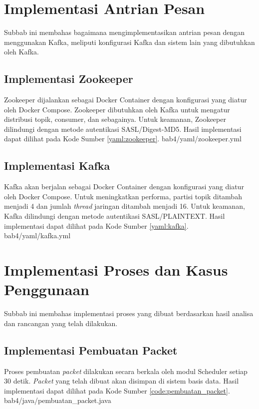 \section{Implementasi Antrian Pesan}
\par Subbab ini membahas bagaimana mengimplementasikan antrian pesan dengan menggunakan Kafka, meliputi konfigurasi Kafka dan sistem lain yang dibutuhkan oleh Kafka.

\subsection{Implementasi Zookeeper}
\par Zookeeper dijalankan sebagai Docker Container dengan konfigurasi yang diatur oleh Docker Compose. Zookeeper dibutuhkan oleh Kafka untuk mengatur distribusi topik, consumer, dan sebagainya. Untuk keamanan, Zookeeper dilindungi dengan metode autentikasi SASL/Digest-MD5. Hasil implementasi dapat dilihat pada Kode Sumber \ref{yaml:zookeeper}.
 {bab4/yaml/zookeeper.yml}

\subsection{Implementasi Kafka}
\par Kafka akan berjalan sebagai Docker Container dengan konfigurasi yang diatur oleh Docker Compose. Untuk meningkatkan performa, partisi topik ditambah menjadi 4 dan jumlah \textit{thread} jaringan ditambah menjadi 16. Untuk keamanan, Kafka dilindungi dengan metode autentikasi SASL/PLAINTEXT. Hasil implementasi dapat dilihat pada Kode Sumber \ref{yaml:kafka}.
 {bab4/yaml/kafka.yml}

\section{Implementasi Proses dan Kasus Penggunaan}
\par Subbab ini membahas implementasi proses yang dibuat berdasarkan hasil analisa dan rancangan yang telah dilakukan.
\clearpage

\subsection{Implementasi Pembuatan Packet}
\par Proses pembuatan \textit{packet} dilakukan secara berkala oleh modul Scheduler setiap 30 detik. \textit{Packet} yang telah dibuat akan disimpan di sistem basis data. Hasil implementasi dapat dilihat pada Kode Sumber \ref{code:pembuatan_packet}.
 {bab4/java/pembuatan_packet.java}

